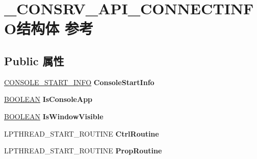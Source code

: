 \hypertarget{struct___c_o_n_s_r_v___a_p_i___c_o_n_n_e_c_t_i_n_f_o}{}\section{\+\_\+\+C\+O\+N\+S\+R\+V\+\_\+\+A\+P\+I\+\_\+\+C\+O\+N\+N\+E\+C\+T\+I\+N\+F\+O结构体 参考}
\label{struct___c_o_n_s_r_v___a_p_i___c_o_n_n_e_c_t_i_n_f_o}
\subsection*{Public 属性}
\begin{DoxyCompactItemize}
\item 
\mbox{\label{struct___c_o_n_s_r_v___a_p_i___c_o_n_n_e_c_t_i_n_f_o_ac7cc16900d80282b9cfae4fffd8b913f}} 
\hyperlink{struct___c_o_n_s_o_l_e___s_t_a_r_t___i_n_f_o}{C\+O\+N\+S\+O\+L\+E\+\_\+\+S\+T\+A\+R\+T\+\_\+\+I\+N\+FO} {\bfseries Console\+Start\+Info}
\item 
\mbox{\label{struct___c_o_n_s_r_v___a_p_i___c_o_n_n_e_c_t_i_n_f_o_a65167a493f7b354efd7d349a55a298d9}} 
\hyperlink{_processor_bind_8h_a112e3146cb38b6ee95e64d85842e380a}{B\+O\+O\+L\+E\+AN} {\bfseries Is\+Console\+App}
\item 
\mbox{\label{struct___c_o_n_s_r_v___a_p_i___c_o_n_n_e_c_t_i_n_f_o_a26a8e6f8695a45affb0623f165666f35}} 
\hyperlink{_processor_bind_8h_a112e3146cb38b6ee95e64d85842e380a}{B\+O\+O\+L\+E\+AN} {\bfseries Is\+Window\+Visible}
\item 
\mbox{\label{struct___c_o_n_s_r_v___a_p_i___c_o_n_n_e_c_t_i_n_f_o_aca26422189f6f029d3ea7fc54ea6021e}} 
L\+P\+T\+H\+R\+E\+A\+D\+\_\+\+S\+T\+A\+R\+T\+\_\+\+R\+O\+U\+T\+I\+NE {\bfseries Ctrl\+Routine}
\item 
\mbox{\label{struct___c_o_n_s_r_v___a_p_i___c_o_n_n_e_c_t_i_n_f_o_a69bea68383c91639a205f8bfa7dc6d25}} 
L\+P\+T\+H\+R\+E\+A\+D\+\_\+\+S\+T\+A\+R\+T\+\_\+\+R\+O\+U\+T\+I\+NE {\bfseries Prop\+Routine}

\end{DoxyCompactItemize}
